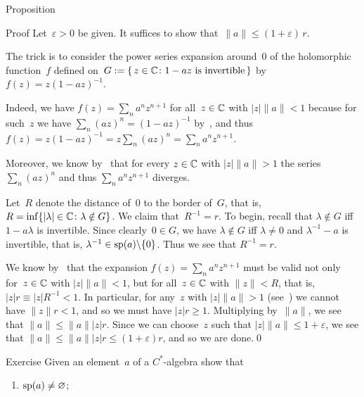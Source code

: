 \documentclass[main]{subfiles}
\begin{document}
\begin{parsec}
\begin{point}{Proposition}
\begin{point}{Proof}
Let~$\varepsilon>0$ be given.
It suffices to show that~$\|a\|\leq (1+\varepsilon)\,r$.
\begin{point}%
The trick is to consider
the power series expansion
around~$0$ of the holomorphic function~$f$ defined
on~$G:=\{\,z\in \mathbb{C}\colon 1-az\text{ is invertible}\,\}$ 
by  $f(z)=z(1-az)^{-1}$.
\end{point}
\begin{point}%
Indeed, we have $f(z) = \sum_n a^nz^{n+1}$
for all~$z\in \mathbb{C}$ with $\left|z\right|\|a\|<1$
because for such~$z$
we have $\sum_n (az)^n=(1-az)^{-1}$
by~,
and thus~$f(z)=z(1-az)^{-1}=z\sum_n (az)^n = \sum_n a^nz^{n+1}$.
\end{point}
\begin{point}%
Moreover,
we know by~
that for every $z\in\mathbb{C}$ with $\left|z\right|\|a\|>1$
the series $\sum_n(az)^n$ 
and thus $\sum_n a^n{z}^{n+1}$ diverges.
\end{point}
\begin{point}%
Let~$R$ denote the distance of~$0$ to
the border of~$G$,
that is, 
$R= \inf\{\left|\lambda\right|\in \mathbb{C}\colon \lambda\notin G\}$.
We claim that~$R^{-1}=r$.
To begin,
recall that $\lambda\notin G$ iff $1-a\lambda$ is invertible.
Since clearly~$0\in G$,
we have $\lambda\notin G$ iff $\lambda\neq 0$ and $\lambda^{-1}-a$ 
is invertible, that is, $\lambda^{-1}\in \mathrm{sp}(a)\backslash\{0\}$.
Thus we see that $R^{-1}=r$.
\end{point}
\begin{point}%
We know by~
that the expansion $f(z)=\sum_na^nz^{n+1}$
must be valid not only for~$z\in\mathbb{C}$ with $\left|z\right|\|a\|<1$,
but for all~$z\in\mathbb{C}$ with 
$\|z\|< R$,
that is, $\left|z\right|r\equiv \left|z\right| R^{-1} < 1$.
In particular,
for any~$z$ with $\left|z\right|\|a\|>1$ 
(see~)
we cannot have $\|z\| r <1$,
and so we must have $\left|z\right| r \geq 1$.
Multiplying by~$\|a\|$,
we see that $\|a\|\leq \|a\|\left|z\right|r$.
Since we can choose~$z$ such that  $\left|z\right|\|a\|\leq 1+\varepsilon$,
we see that $\|a\|\leq \|a\|\left|z\right|r \leq (1+\varepsilon)r $,
and so we are done.\qed
\end{point}
\end{point}
\end{point}
\begin{point}{Exercise}%
Given an element~$a$ of a $C^*$-algebra show that
\begin{enumerate}
\item $\mathrm{sp}(a)\neq \varnothing$;

\end{enumerate}
\end{point}
\end{parsec}
\end{document}
